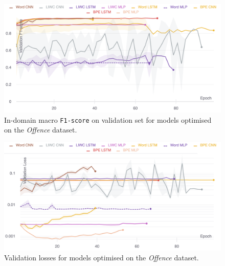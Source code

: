 \begin{figure}
    \centering
    \includegraphics[width=\textwidth]{davidson_dev_f1.pdf}
    \caption{In-domain macro \texttt{F1-score} on validation set for models optimised on the \textit{Offence} dataset.}
    \label{fig:davidson_dev_f1}
\end{figure}

\begin{figure}
    \centering
    \includegraphics[width=\textwidth]{davidson_dev_loss_stderr_logscale.pdf}
    \caption{Validation losses for models optimised on the \textit{Offence} dataset.}
    \label{fig:davidson_dev_loss}
\end{figure}

